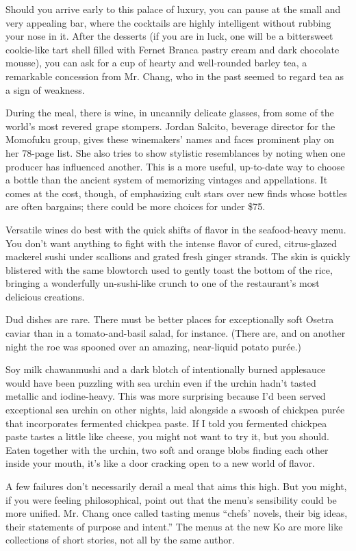 Should you arrive early to this palace of luxury, you can pause at the
small and very appealing bar, where the cocktails are highly intelligent
without rubbing your nose in it. After the desserts (if you are in luck,
one will be a bittersweet cookie-like tart shell filled with Fernet
Branca pastry cream and dark chocolate mousse), you can ask for a cup of
hearty and well-rounded barley tea, a remarkable concession from Mr.
Chang, who in the past seemed to regard tea as a sign of weakness.

During the meal, there is wine, in uncannily delicate glasses, from some
of the world's most revered grape stompers. Jordan Salcito, beverage
director for the Momofuku group, gives these winemakers' names and faces
prominent play on her 78-page list. She also tries to show stylistic
resemblances by noting when one producer has influenced another. This is
a more useful, up-to-date way to choose a bottle than the ancient system
of memorizing vintages and appellations. It comes at the cost, though,
of emphasizing cult stars over new finds whose bottles are often
bargains; there could be more choices for under \$75.

Versatile wines do best with the quick shifts of flavor in the
seafood-heavy menu. You don't want anything to fight with the intense
flavor of cured, citrus-glazed mackerel sushi under scallions and grated
fresh ginger strands. The skin is quickly blistered with the same
blowtorch used to gently toast the bottom of the rice, bringing a
wonderfully un-sushi-like crunch to one of the restaurant's most
delicious creations.

Dud dishes are rare. There must be better places for exceptionally soft
Osetra caviar than in a tomato-and-basil salad, for instance. (There
are, and on another night the roe was spooned over an amazing,
near-liquid potato purée.)

Soy milk chawanmushi and a dark blotch of intentionally burned
applesauce would have been puzzling with sea urchin even if the urchin
hadn't tasted metallic and iodine-heavy. This was more surprising
because I'd been served exceptional sea urchin on other nights, laid
alongside a swoosh of chickpea purée that incorporates fermented
chickpea paste. If I told you fermented chickpea paste tastes a little
like cheese, you might not want to try it, but you should. Eaten
together with the urchin, two soft and orange blobs finding each other
inside your mouth, it's like a door cracking open to a new world of
flavor.

A few failures don't necessarily derail a meal that aims this high. But
you might, if you were feeling philosophical, point out that the menu's
sensibility could be more unified. Mr. Chang once called tasting menus
``chefs' novels, their big ideas, their statements of purpose and
intent.'' The menus at the new Ko are more like collections of short
stories, not all by the same author.

